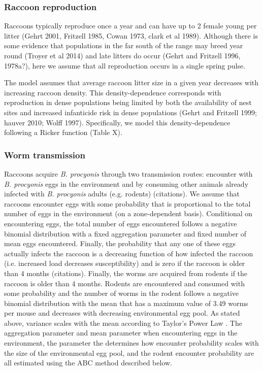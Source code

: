 \documentclass[11pt]{article}
\begin{document}
\subsubsection{Raccoon reproduction}

Raccoons typically reproduce once a year and can have up to 2 female
young per litter (Gehrt 2001, Fritzell 1985, Cowan 1973, clark et al
1989). Although there is some evidence that populations in the far south
of the range may breed year round (Troyer et al 2014) and late litters
do occur (Gehrt and Fritzell 1996, 1978a?), here we assume that all
reproduction occurs in a single spring pulse.

The model assumes that average raccoon litter size in a given year
decreases with increasing raccoon density. This density-dependence
corresponds with reproduction in dense populations being limited by both
the availability of nest sites and increased infanticide risk in dense
populations (Gehrt and Fritzell 1999; hauver 2010; Wolff 1997).
Specifically, we model this density-dependence following a Ricker
function (Table X).

\subsubsection{Worm transmission}

Raccoons acquire \emph{B. procyonis} through two transmission routes:
encounter with \emph{B. procyonis} eggs in the environment and by
consuming other animals already infected with \emph{B. procyonis} adults
(e.g. rodents) (citations).  We assume that raccoons encounter eggs with some probability that is proportional to the total number of eggs in the environment (on a zone-dependent basis). Conditional on encountering eggs, the total number of eggs encountered follows a negative binomial distribution with a fixed aggregation parameter and fixed number of mean eggs encountered.  Finally, the probability that any one of these eggs actually infects the raccoon is a decreasing function of how infected the raccoon (i.e. increased load decreases susceptibility) and is zero if the raccoon is older than 4 months (citations). Finally, the worms are acquired from rodents if the raccoon is older than 4 months.  Rodents are encountered and consumed with some probability and the number of worms in the rodent follows a negative binomial distribution with the mean that has a maximum value of 3.49 worms per mouse and decreases with decreasing environmental egg pool. As stated above, variance scales with the mean according to Taylor's Power Law \citep{Shaw1995}.  The aggregation parameter and mean parameter when encountering eggs in the environment, the parameter the determines how encounter probability scales with the size of the environmental egg pool, and the rodent encounter probability are all estimated using the ABC method described below.
\end{document}
